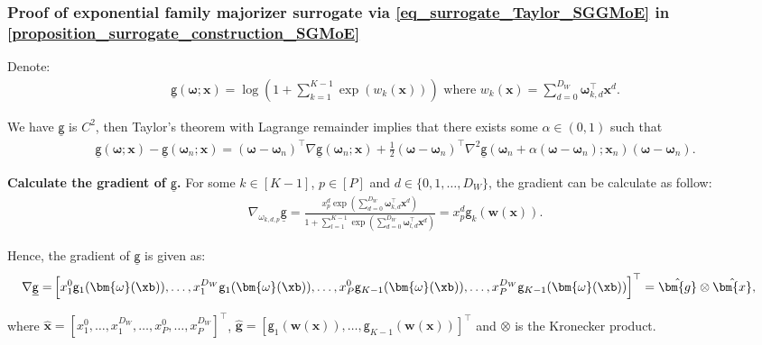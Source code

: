\documentclass{article}
\def\sfg{\mathsf{g}}
\def\vomega{{\bm{\omega}}}
\def\evomega{\omega}
\def\vg{{\bm{g}}}
\def\vw{{\bm{w}}}
\def\vx{{\bm{x}}}
\def\evomega{{\omega}}
\def\evx{{x}}
\begin{document}
\subsubsection{Proof of exponential family majorizer surrogate via \texorpdfstring{\cref{eq_surrogate_Taylor_SGGMoE}}{Equation (\ref*{eq_surrogate_Taylor_SGGMoE})} in \texorpdfstring{\cref{proposition_surrogate_construction_SGMoE}}{Proposition \ref*{proposition_surrogate_construction_SGMoE}}}\label{sec_exponential_family_surrogate}
\par Denote:
\begin{align*}
    \underline{\sfg}(\vomega;\vx)=\log\left(1+\displaystyle\sum_{k=1}^{K-1}\exp\left(w_k(\vx)\right)\right) \text{ where } w_k(\vx)=\displaystyle\sum_{d=0}^{D_W}\vomega_{k,d}^{\top}\vx^{d}.
\end{align*}
\par We have $\underline{\sfg}$ is $C^2$, then Taylor's theorem with Lagrange remainder implies that there exists some $\alpha \in (0,1)$ such that
\begin{align}\label{eq_Taylor}
    \underline{\sfg}(\vomega;\vx)-\underline{\sfg}(\vomega_n;\vx)=\left(\vomega-\vomega_n\right)^{\top}\nabla  \underline{\sfg} \left(\vomega_n;\vx\right)+\frac{1}{2}\left(\vomega-\vomega_n\right)^{\top}\nabla^{2}\underline{\sfg}\left(\vomega_n+\alpha\left(\vomega-\vomega_n\right);\vx_n\right)\left(\vomega-\vomega_n\right).
\end{align}

{\bf Calculate the gradient of $\underline{\sfg}$.} For some $k \in [K-1]$, $p\in [P]$ and $d \in \{0,1,\dots,D_W\}$, the gradient can be calculate as follow:
\begin{align*}
    \nabla_{\evomega_{k,d,p}}\underline{\sfg}=\frac{\evx^{d}_p\exp\left(\displaystyle\sum_{d=0}^{D_W}\vomega_{k,d}^{\top}\vx^{d}\right)}{1+\displaystyle\sum_{l=1}^{K-1}\exp\left(\displaystyle\sum_{d=0}^{D_W}\vomega_{l,d}^{\top}\vx^{d}\right)}=\evx^{d}_p\sfg_k(\vw(\vx)).
\end{align*}
\par Hence, the gradient of $\underline{\sfg}$ is given as:
\begin{align*}
    \nabla \underline{\sfg}
	=&\left[x_1^{0} \sfg_1(\vomega(\xb)),\dots,x_1^{D_W} \sfg_1(\vomega(\xb)),\ldots,x_{P}^{0}\sfg_{K-1}(\vomega(\xb)),\dots,x_{P}^{D_W}\sfg_{K-1}(\vomega(\xb))\right]^{\top}=\hat{\vg}\otimes\hat{\vx},
\end{align*}
\par where $\hat{\vx}=\left[x_1^{0},\dots,x_1^{D_W},\dots,x_P^{0},\dots,x_P^{D_W}\right]^{\top}$, $\hat{\vg}=\left[ \sfg_1(\vw(\vx)),\dots,\sfg_{K-1}(\vw(\vx))\right]^{\top}$ and $\otimes$ is the Kronecker product.\\
\end{document}
